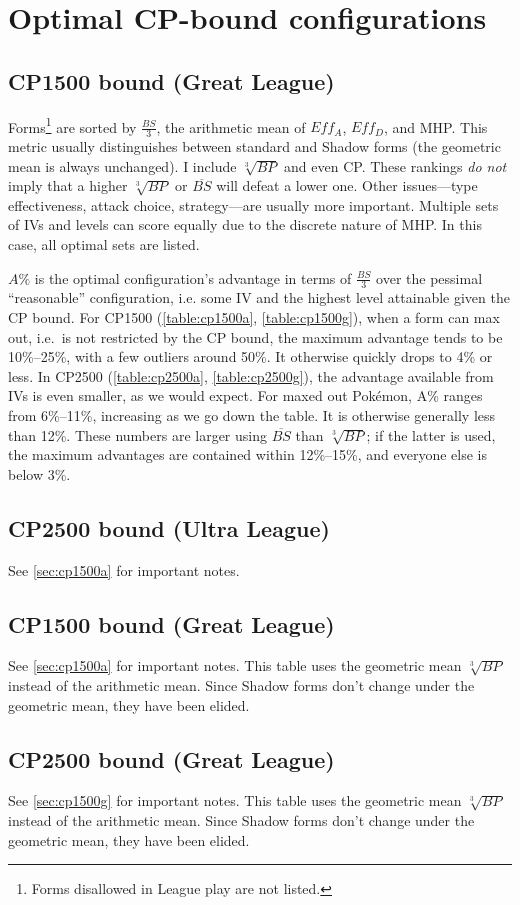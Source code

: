 \chapter{Optimal CP-bound configurations\label{chap:optimal}}
\section{CP1500 bound (Great League)\label{sec:cp1500a}}
Forms\footnote{Forms disallowed in League play are not listed.} are sorted by $\frac{BS}{3}$,
  the arithmetic mean of $Eff_A$, $Eff_D$, and MHP\@.
This metric usually distinguishes between standard and Shadow forms (the geometric mean is always unchanged).
I include $\sqrt[3]{BP}$ and even CP\@.
These rankings \textit{do not} imply that a higher $\sqrt[3]{BP}$ or $\overline{BS}$
  will defeat a lower one.
Other issues---type effectiveness, attack choice, strategy---are usually more important.
Multiple sets of IVs and levels can score equally due to the discrete nature of MHP\@.
In this case, all optimal sets are listed.

$A\%$ is the optimal configuration's advantage in terms of $\frac{BS}{3}$
  over the pessimal ``reasonable'' configuration, i.e. some IV
  and the highest level attainable given the CP bound.
For CP1500 (\autoref{table:cp1500a}, \autoref{table:cp1500g}), when a form can max out, i.e.\ is not restricted by the CP bound,
  the maximum advantage tends to be 10\%--25\%, with a few outliers around 50\%.
It otherwise quickly drops to 4\% or less.
In CP2500 (\autoref{table:cp2500a}, \autoref{table:cp2500g}), the advantage available from IVs is even smaller, as we would expect.
For maxed out Pokémon, A\% ranges from 6\%--11\%, increasing as we go down the table.
It is otherwise generally less than 12\%.
These numbers are larger using $\overline{BS}$ than $\sqrt[3]{BP}$; if the latter is used,
  the maximum advantages are contained within 12\%--15\%, and everyone
  else is below 3\%.

\section{CP2500 bound (Ultra League)}
See \autoref{sec:cp1500a} for important notes.

\section{CP1500 bound (Great League)\label{sec:cp1500g}}
See \autoref{sec:cp1500a} for important notes.
This table uses the geometric mean $\sqrt[3]{BP}$ instead of the arithmetic mean.
Since Shadow forms don't change under the geometric mean, they have been elided.

\section{CP2500 bound (Great League)\label{sec:cp2500g}}
See \autoref{sec:cp1500g} for important notes.
This table uses the geometric mean $\sqrt[3]{BP}$ instead of the arithmetic mean.
Since Shadow forms don't change under the geometric mean, they have been elided.

